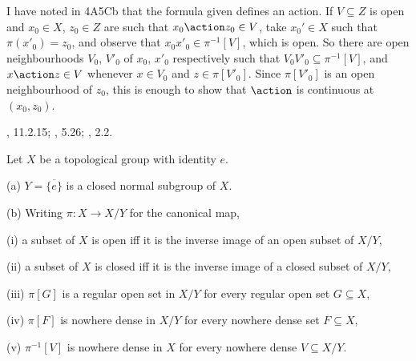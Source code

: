 {\medskip

 I have noted in 4A5Cb that the formula given defines an
action.   If $V\subseteq Z$ is open and $x_0\in X$,
$z_0\in Z$ are such that $x_0\action z_0\in V$, take $x_0'\in X$ such
that $\pi(x'_0)=z_0$, and observe that $x_0x'_0\in\pi^{-1}[V]$, which is
open.   So there are open neighbourhoods $V_0$, $V'_0$ of $x_0$, $x'_0$
respectively such that $V_0V'_0\subseteq\pi^{-1}[V]$, and
$x\action z\in V$ whenever
$x\in V_0$ and $z\in\pi[V'_0]$.   Since $\pi[V'_0]$ is an open
neighbourhood of $z_0$, this is enough to show that $\action$ is
continuous at $(x_0,z_0)$.

\medskip

 \Csaszar, 11.2.15;  \HR, 5.26;  \Folland, 2.2.
}%

 Let $X$ be a topological group with identity
$e$.

(a) $Y=\overline{\{e\}}$ is a closed normal subgroup of $X$.

(b) Writing $\pi:X\to X/Y$ for the canonical map,

\quad(i) a subset of $X$ is open iff it is the inverse image of an open
subset of $X/Y$,

\quad(ii) a subset of $X$ is closed iff it is the inverse image of a
closed subset of $X/Y$,

\quad(iii) $\pi[G]$ is a regular open set in $X/Y$ for every
regular open set $G\subseteq X$,

\quad(iv) $\pi[F]$ is nowhere dense in $X/Y$ for every nowhere dense set
$F\subseteq X$,

\quad(v) $\pi^{-1}[V]$ is nowhere dense in $X$ for every nowhere dense
$V\subseteq X/Y$.

